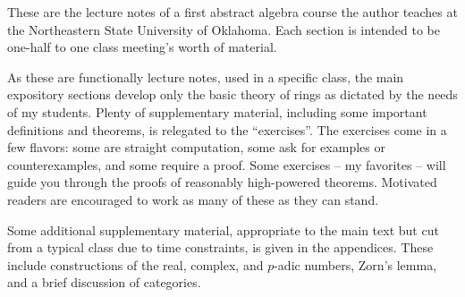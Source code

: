 These are the lecture notes of a first abstract algebra course the author teaches at the Northeastern State University of Oklahoma.
Each section is intended to be one-half to one class meeting's worth of material.

As these are functionally lecture notes, used in a specific class, the main expository sections develop only the basic theory of rings as dictated by the needs of my students.
Plenty of supplementary material, including some important definitions and theorems, is relegated to the ``exercises''.
The exercises come in a few flavors: some are straight computation, some ask for examples or counterexamples, and some require a proof.
Some exercises -- my favorites -- will guide you through the proofs of reasonably high-powered theorems.
Motivated readers are encouraged to work as many of these as they can stand.

Some additional supplementary material, appropriate to the main text but cut from a typical class due to time constraints, is given in the appendices.
These include constructions of the real, complex, and \(p\)-adic numbers, Zorn's lemma, and a brief discussion of categories.
